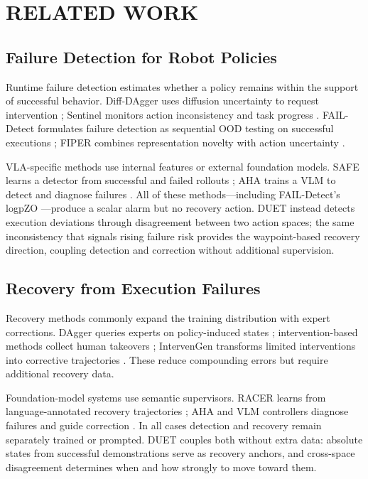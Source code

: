 \documentclass[letterpaper, 10 pt, conference]{ieeeconf}
\begin{document}
\section{RELATED WORK}

\subsection{Failure Detection for Robot Policies}
Runtime failure detection estimates whether a policy remains within the support of successful behavior. Diff-DAgger uses diffusion uncertainty to request intervention \cite{diffdagger}; Sentinel monitors action inconsistency and task progress \cite{sentinel}. FAIL-Detect formulates failure detection as sequential OOD testing on successful executions \cite{faildetect}; FIPER combines representation novelty with action uncertainty \cite{fiper}.

VLA-specific methods use internal features or external foundation models. SAFE learns a detector from successful and failed rollouts \cite{safe}; AHA trains a VLM to detect and diagnose failures \cite{aha}. All of these methods---including FAIL-Detect's logpZO \cite{faildetect}---produce a scalar alarm but no recovery action. DUET instead detects execution deviations through disagreement between two action spaces; the same inconsistency that signals rising failure risk provides the waypoint-based recovery direction, coupling detection and correction without additional supervision.

\subsection{Recovery from Execution Failures}
Recovery methods commonly expand the training distribution with expert corrections. DAgger queries experts on policy-induced states \cite{dagger}; intervention-based methods collect human takeovers \cite{eil,sirius}; IntervenGen transforms limited interventions into corrective trajectories \cite{intervengen}. These reduce compounding errors but require additional recovery data.

Foundation-model systems use semantic supervisors. RACER learns from language-annotated recovery trajectories \cite{racer}; AHA and VLM controllers diagnose failures and guide correction \cite{aha,vlmrecovery}. In all cases detection and recovery remain separately trained or prompted. DUET couples both without extra data: absolute states from successful demonstrations serve as recovery anchors, and cross-space disagreement determines when and how strongly to move toward them.
\end{document}
